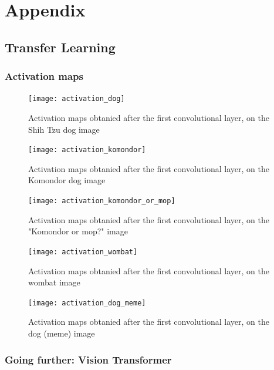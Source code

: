 \chapter{Appendix}
\section{Transfer Learning}
\graphicspath{{figs/2a/}}
\subsection{Activation maps} \label{appendix:activation_maps}

\begin{figure}[H]
    \centering
    \texttt{[image: activation\_dog]}
    \caption{Activation maps obtanied after the first convolutional layer, on the Shih Tzu dog image}
    \label{fig:activation_dog}
\end{figure} 

\begin{figure}[H]
    \centering
    \texttt{[image: activation\_komondor]}
    \caption{Activation maps obtanied after the first convolutional layer, on the Komondor dog image}
    \label{fig:activation_komondor}
\end{figure} 

\begin{figure}[H]
    \centering
    \texttt{[image: activation\_komondor\_or\_mop]}
    \caption{Activation maps obtanied after the first convolutional layer, on the "Komondor or mop?" image}
    \label{fig:activation_komondor_or_mop}
\end{figure} 

\begin{figure}[H]
    \centering
    \texttt{[image: activation\_wombat]}
    \caption{Activation maps obtanied after the first convolutional layer, on the wombat image}
    \label{fig:activation_wombat}
\end{figure} 

\begin{figure}[H]
    \centering
    \texttt{[image: activation\_dog\_meme]}
    \caption{Activation maps obtanied after the first convolutional layer, on the dog (meme) image}
    \label{fig:activation_dog_meme}
\end{figure} 

\subsection{Going further: Vision Transformer} \label{appendix:vit}

